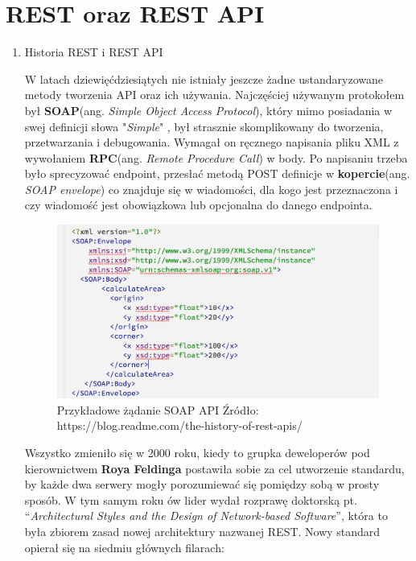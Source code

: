 \documentclass[oneside,polski,logo,indent]{amuthesis}
\begin{document}
\section{REST oraz REST API}
\begin{enumerate}
\item{Historia REST i REST API}\newline

W latach dziewięćdziesiątych nie istniały jeszcze żadne ustandaryzowane metody tworzenia API oraz ich używania. Najczęściej używanym protokołem był \textbf{SOAP}(ang. \emph{Simple Object Access Protocol}), który mimo posiadania w swej definicji słowa "\emph{Simple}" , był strasznie skomplikowany do tworzenia, przetwarzania i debugowania. Wymagał on ręcznego napisania pliku XML z wywołaniem \textbf{RPC}(ang. \emph{Remote Procedure Call}) w body. Po napisaniu trzeba było sprecyzować endpoint, przesłać metodą POST definicje w \textbf{kopercie}(ang. \emph{SOAP envelope}) co znajduje się w wiadomości, dla kogo jest przeznaczona i czy wiadomość jest obowiązkowa lub opcjonalna do danego endpointa.
\begin{figure}[H]
\centering
\includegraphics[width=14cm]{SOAP.png}
\caption{Przykładowe żądanie SOAP API\newline
Źródło: https://blog.readme.com/the-history-of-rest-apis/}
\label{SOAP API}
\end{figure}
Wszystko zmieniło się w 2000 roku, kiedy to grupka deweloperów pod kierownictwem \textbf{Roya Feldinga} postawiła sobie za cel utworzenie standardu, by każde dwa serwery mogły porozumiewać się pomiędzy sobą w prosty sposób. W tym samym roku ów lider wydał rozprawę doktorską pt. “\emph{Architectural Styles and the Design of Network-based Software}”, która to była zbiorem zasad nowej architektury nazwanej REST. Nowy standard opierał się na siedmiu głównych filarach:\newline 

\end{enumerate}
\end{document}
